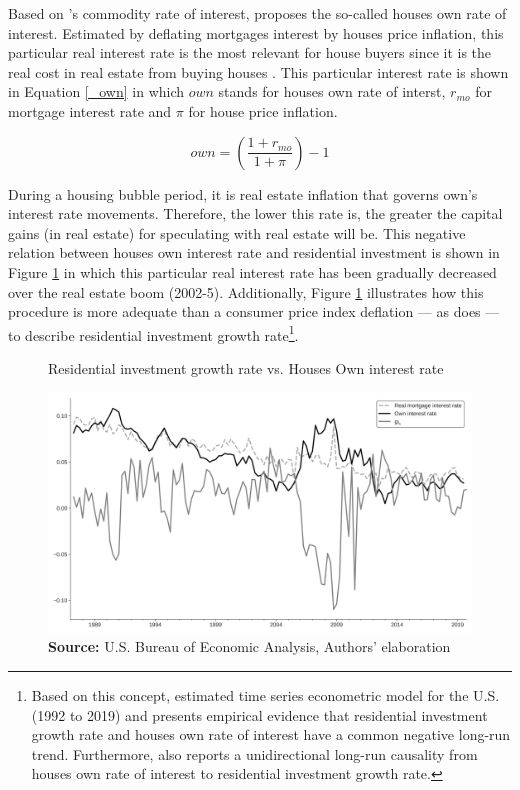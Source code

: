 \documentclass[11pt]{article}
\begin{document}
Based on \citeauthor*{Sraffa_Own_1932}'s \citeyear{Sraffa_Own_1932} commodity rate of interest, \textcite{teixeira_crescimento_2015} proposes the so-called houses own rate of interest.
Estimated by deflating mortgages interest by houses price inflation, this particular real interest rate is the most relevant for house buyers since it is the real cost in real estate from buying houses  \cite[p.~53]{teixeira_crescimento_2015}.
This particular interest rate is shown in Equation \ref{_own} in which \(own\) stands for houses own rate of interst, \(r_{mo}\) for mortgage interest rate and \(\pi\) for house price inflation.


\begin{equation}
\label{_own}
own = \left(\frac{1+r_{mo}}{1+\pi}\right) -1
\end{equation}

During a housing bubble period, it is real estate inflation that governs own's interest rate movements. Therefore, the lower this rate is, the greater the capital gains (in real estate) for speculating with real estate will be. This negative relation between houses own interest rate and residential investment is shown in Figure \ref{propria_investo} in which this particular real interest rate has been gradually decreased over the real estate boom (2002-5).
Additionally, Figure \ref{propria_investo} illustrates how this  procedure is more adequate than a consumer price index deflation --- as \textcite[p.~143--6]{fair_macroeconometric_2013} does --- to describe residential investment growth rate\footnote{Based on this concept, \textcite{petrini_demanda_2019} estimated time series econometric model for the U.S. (1992 to 2019) and presents empirical evidence that residential investment growth rate and houses own rate of interest have a common negative long-run trend.  Furthermore, \textcite{petrini_demanda_2019} also reports a unidirectional long-run causality from houses own rate of interest to residential investment growth rate.}.


\begin{figure}[htb]
	\centering
	\caption{Residential investment growth rate vs. Houses Own interest rate}
	\label{propria_investo}
	\includegraphics[width=.8\textwidth]{./figs/Own_gI}
	\caption*{\textbf{Source:} U.S. Bureau of Economic Analysis, Authors' elaboration}
\end{figure}
\end{document}
